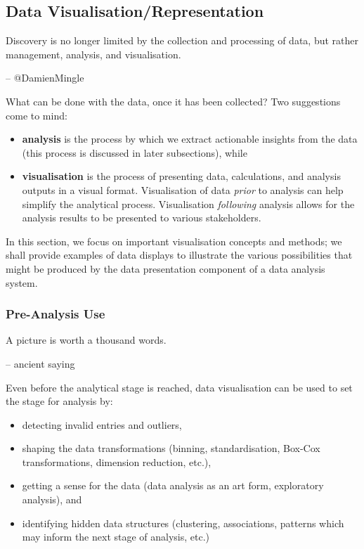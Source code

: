 \subsection{Data Visualisation/Representation}
\label{sec:DV}
\begin{tcolorbox}[title=Analysis in the Modern Age]
Discovery is no longer limited by the collection and processing of data, but rather management, analysis, and visualisation. \\[-0.6cm]
\begin{flushright}
-- @DamienMingle
\end{flushright}
\end{tcolorbox}
\noindent What can be done with the data, once it has been collected? Two suggestions come to mind: 
\begin{itemize}[noitemsep,topsep=2pt]
\item \textbf{analysis} is the process by which we extract actionable insights from the data (this process is discussed in later subsections), while
\item \textbf{visualisation} is the process of presenting data, calculations, and analysis outputs in a visual format. Visualisation of data \textit{prior} to analysis can help simplify the analytical process. Visualisation \textit{following} analysis allows for the analysis results to be presented to various stakeholders.  
\end{itemize}
\vspace{3pt}
In this section, we focus on important visualisation concepts and methods; we shall provide examples of data displays to illustrate the various possibilities that might be produced by the data presentation component of a data analysis system.   
\subsubsection{Pre-Analysis Use}
\begin{tcolorbox}[title=The Ying.. ]
A picture is worth a thousand words.\\[-0.6cm]
\begin{flushright}
-- ancient saying
\end{flushright}
\end{tcolorbox}\noindent Even before the analytical stage is reached, data visualisation can be used to set the stage for analysis by:
\begin{itemize}[noitemsep,topsep=2pt]
\item detecting invalid entries and outliers,
\item shaping the data transformations (binning, standardisation, Box-Cox transformations, dimension reduction, etc.),
\item getting a sense for the data (data analysis as an art form, exploratory analysis), and 
\item identifying hidden data structures (clustering, associations, patterns which may inform the next stage of analysis, etc.)
\end{itemize}
